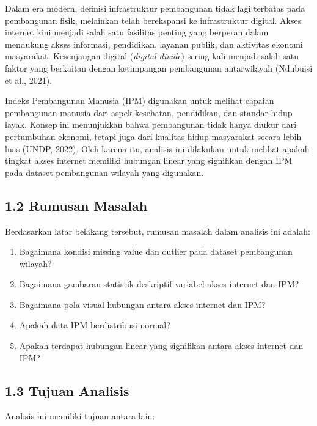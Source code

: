 \documentclass[
  indonesian,
  letterpaper,
  DIV=11,
  numbers=noendperiod]{scrartcl}
\providecommand{\tightlist}{%
  \setlength{\itemsep}{0pt}\setlength{\parskip}{0pt}}
\begin{document}
Dalam era modern, definisi infrastruktur pembangunan tidak lagi terbatas
pada pembangunan fisik, melainkan telah berekspansi ke infrastruktur
digital. Akses internet kini menjadi salah satu fasilitas penting yang
berperan dalam mendukung akses informasi, pendidikan, layanan publik,
dan aktivitas ekonomi masyarakat. Kesenjangan digital (\emph{digital
divide}) sering kali menjadi salah satu faktor yang berkaitan dengan
ketimpangan pembangunan antarwilayah (Ndubuisi et al., 2021).

Indeks Pembangunan Manusia (IPM) digunakan untuk melihat capaian
pembangunan manusia dari aspek kesehatan, pendidikan, dan standar hidup
layak. Konsep ini menunjukkan bahwa pembangunan tidak hanya diukur dari
pertumbuhan ekonomi, tetapi juga dari kualitas hidup masyarakat secara
lebih luas (UNDP, 2022). Oleh karena itu, analisis ini dilakukan untuk
melihat apakah tingkat akses internet memiliki hubungan linear yang
signifikan dengan IPM pada dataset pembangunan wilayah yang digunakan.

\subsection{1.2 Rumusan Masalah}\label{rumusan-masalah}

Berdasarkan latar belakang tersebut, rumusan masalah dalam analisis ini
adalah:

\begin{enumerate}
\def\labelenumi{\arabic{enumi}.}
\tightlist
\item
  Bagaimana kondisi missing value dan outlier pada dataset pembangunan
  wilayah?
\item
  Bagaimana gambaran statistik deskriptif variabel akses internet dan
  IPM?
\item
  Bagaimana pola visual hubungan antara akses internet dan IPM?
\item
  Apakah data IPM berdistribusi normal?
\item
  Apakah terdapat hubungan linear yang signifikan antara akses internet
  dan IPM?
\end{enumerate}

\subsection{1.3 Tujuan Analisis}\label{tujuan-analisis}

Analisis ini memiliki tujuan antara lain:
\end{document}
